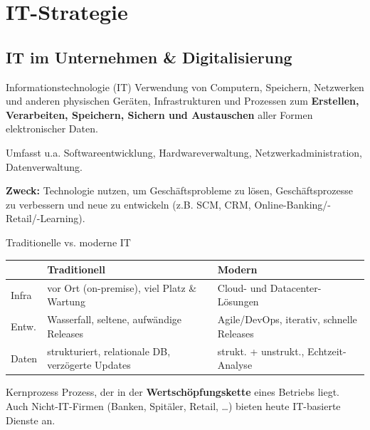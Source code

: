 \documentclass[a4paper, fontsize=7pt]{scrartcl}
\renewcommand*{\arraystretch}{1.5}  %
\begin{document}
\section{IT-Strategie}

\subsection{IT im Unternehmen \& Digitalisierung}

\begin{mainbox}{Informationstechnologie (IT)}
Verwendung von Computern, Speichern, Netzwerken und anderen physischen Geräten,
Infrastrukturen und Prozessen zum \textbf{Erstellen, Verarbeiten, Speichern,
Sichern und Austauschen} aller Formen elektronischer Daten.

Umfasst u.a. Softwareentwicklung, Hardwareverwaltung,
Netzwerkadministration, Datenverwaltung.

\textbf{Zweck:} Technologie nutzen, um Geschäftsprobleme zu lösen,
Geschäftsprozesse zu verbessern und neue zu entwickeln
(z.B. SCM, CRM, Online-Banking/-Retail/-Learning).
\end{mainbox}

\begin{subbox}{Traditionelle vs. moderne IT}
\renewcommand*{\arraystretch}{1.2}
\begin{tabularx}{\linewidth}{@{}l|>{\raggedright\arraybackslash}X|>{\raggedright\arraybackslash}X@{}}
 & \textbf{Traditionell} & \textbf{Modern} \\
\hline
Infra & vor Ort (on-premise), viel Platz \& Wartung & Cloud- und
  Datacenter-Lösungen \\
Entw. & Wasserfall, seltene, aufwändige Releases & Agile/DevOps,
  iterativ, schnelle Releases \\
Daten & strukturiert, relationale DB, verzögerte Updates & strukt. + unstrukt.,
  Echtzeit-Analyse \\
\end{tabularx}
\end{subbox}

\begin{subbox}{Kernprozess}
Prozess, der in der \textbf{Wertschöpfungskette} eines Betriebs liegt.
Auch Nicht-IT-Firmen (Banken, Spitäler, Retail, \dots) bieten heute
IT-basierte Dienste an.
\end{subbox}
\end{document}
